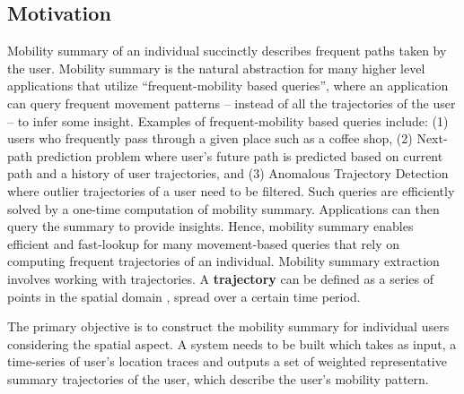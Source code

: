 \subsection{Motivation}
Mobility summary of an individual succinctly describes frequent paths taken by the user. Mobility summary is the natural abstraction for many higher level applications that utilize ``frequent-mobility based queries'', where an application can query frequent movement patterns -- instead of all the trajectories of the user -- to infer some insight.
Examples of frequent-mobility based queries include: (1) users who frequently pass through a given place such as a coffee shop, (2) Next-path prediction problem where user's future path is predicted based on current path and a history of user trajectories, and  (3) Anomalous Trajectory Detection where outlier trajectories of a user need to be filtered. Such queries are efficiently solved by a one-time computation of mobility summary. Applications can then query the summary to provide insights. Hence, mobility summary enables efficient and fast-lookup for many movement-based queries that rely on computing frequent trajectories of an individual. Mobility summary extraction involves working with trajectories. A \textbf{trajectory} can be defined as a series of points in the spatial domain , spread over a certain time period.

The primary objective is to construct the mobility summary for individual users considering the spatial aspect. A system needs to be built  which takes as input, a time-series of user's location traces and outputs a set of weighted representative summary trajectories of the user, which describe the user's mobility pattern. 
